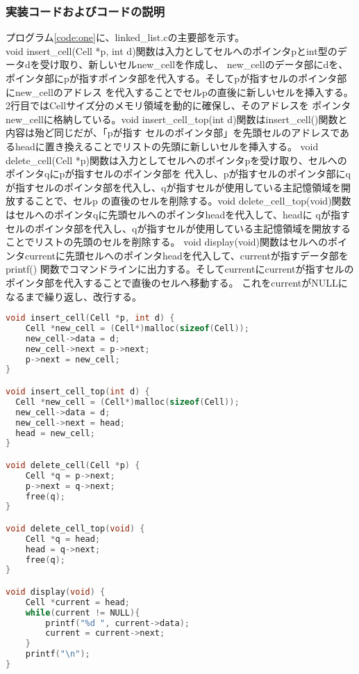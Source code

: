 \documentclass{ltjsarticle}
\begin{document}
\subsubsection{実装コードおよびコードの説明}\label{subsubsec:実装コードおよびコードの説明1}
プログラム\ref{code:one}に、linked\_list.cの主要部を示す。 \\ \indent
void insert\_cell(Cell *p, int d)関数は入力としてセルへのポインタpとint型のデータdを受け取り、新しいセルnew\_cellを作成し、
new_cellのデータ部にdを、ポインタ部にpが指すポインタ部を代入する。そしてpが指すセルのポインタ部にnew_cellのアドレス
を代入することでセルpの直後に新しいセルを挿入する。2行目ではCellサイズ分のメモリ領域を動的に確保し、そのアドレスを
ポインタnew_cellに格納している。void insert\_cell\_top(int d)関数はinsert\_cell()関数と内容は殆ど同じだが、「pが指す
セルのポインタ部」を先頭セルのアドレスであるheadに置き換えることでリストの先頭に新しいセルを挿入する。
void delete\_cell(Cell *p)関数は入力としてセルへのポインタpを受け取り、セルへのポインタqにpが指すセルのポインタ部を
代入し、pが指すセルのポインタ部にqが指すセルのポインタ部を代入し、qが指すセルが使用している主記憶領域を開放することで、セルp
の直後のセルを削除する。void delete\_cell\_top(void)関数はセルへのポインタqに先頭セルへのポインタheadを代入して、headに
qが指すセルのポインタ部を代入し、qが指すセルが使用している主記憶領域を開放することでリストの先頭のセルを削除する。
void display(void)関数はセルへのポインタcurrentに先頭セルへのポインタheadを代入して、currentが指すデータ部をprintf()
関数でコマンドラインに出力する。そしてcurrentにcurrentが指すセルのポインタ部を代入することで直後のセルへ移動する。
これをcurrentがNULLになるまで繰り返し、改行する。
\begin{lstlisting}[caption=linked\_list.cの主要部, label=code:one, language=C]
void insert_cell(Cell *p, int d) {
    Cell *new_cell = (Cell*)malloc(sizeof(Cell));
    new_cell->data = d;
    new_cell->next = p->next;
    p->next = new_cell;
}

void insert_cell_top(int d) {
  Cell *new_cell = (Cell*)malloc(sizeof(Cell));
  new_cell->data = d;
  new_cell->next = head;
  head = new_cell;
}

void delete_cell(Cell *p) {
    Cell *q = p->next;
    p->next = q->next;
    free(q);
}

void delete_cell_top(void) {
    Cell *q = head;
    head = q->next;
    free(q);
}

void display(void) {
    Cell *current = head;
    while(current != NULL){
        printf("%d ", current->data);
        current = current->next;
    }
    printf("\n");
}
\end{lstlisting}
\end{document}
